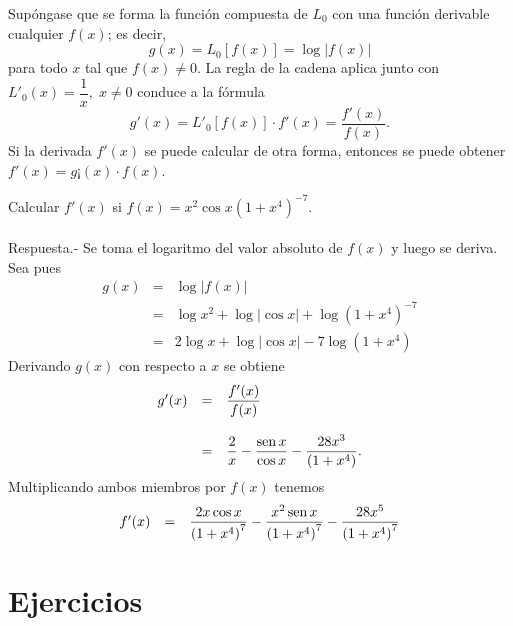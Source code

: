 Supóngase que se forma la función compuesta de $L_0$ con una función derivable cualquier $f(x)$; es decir,
$$g(x)=L_0\left[f(x)\right] = \log|f(x)|$$
para todo $x$ tal que $f(x)\neq 0$. La regla de la cadena aplica junto con $L'_0(x)=\dfrac{1}{x},\; x\neq 0$ conduce a la fórmula
$$g'(x)=L'_0\left[f(x)\right]\cdot f'(x)=\dfrac{f'(x)}{f(x)}.$$
Si la derivada $f'(x)$ se puede calcular de otra forma, entonces se puede obtener $f'(x)=g¡(x)\cdot f(x)$.

\begin{ejem}
    Calcular $f'(x)$ si $f(x)=x^2\cos x\left(1+x^4\right)^{-7}.$\\\\
	Respuesta.-\; Se toma el logaritmo del valor absoluto de $f(x)$ y luego se deriva.\\
	Sea pues
	$$
	\begin{array}{rcl}
	    g(x)&=&\log|f(x)|\\
		&=&\log x^2 + \log|\cos x| + \log\left(1+x^4\right)^{-7}\\
		&=& 2\log x + \log|\cos x| - 7\log\left(1+x^4\right)
	\end{array}
	$$
	Derivando $g(x)$ con respecto a $x$ se obtiene
	$$
	\begin{array}{rcl}
	    g'(x) &=& \dfrac{f'(x)}{f(x)}\\\\
		  &=& \dfrac{2}{x}-\dfrac{\mathop{\mbox{\normalfont sen}}\nolimits x}{\cos x}-\dfrac{28x^3}{(1+x^4)}.
	\end{array}
	$$
	Multiplicando ambos miembros por $f(x)$ tenemos
	$$
	\begin{array}{rcl}
	    f'(x) &=& \dfrac{2x\cos x}{\left(1+x^4\right)^7}-\dfrac{x^2\mathop{\mbox{\normalfont sen}}\nolimits x}{\left(1+x^4\right)^7}-\dfrac{28x^5}{\left(1+x^4\right)^7}
	\end{array}
	$$

\end{ejem}


\section{Ejercicios}

